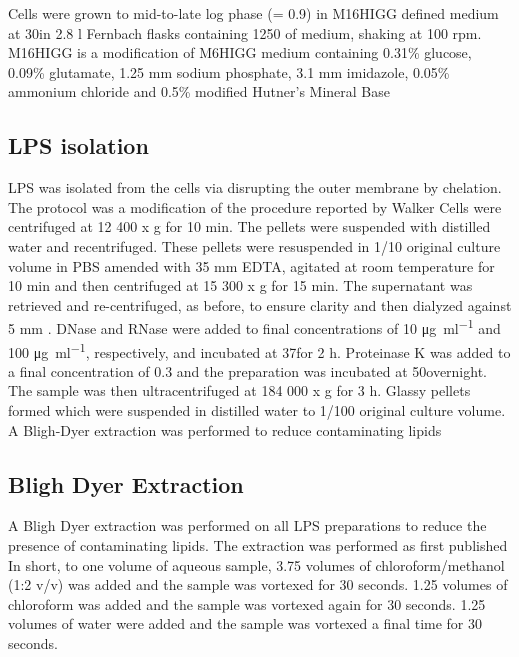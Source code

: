 		Cells were grown to mid-to-late log phase (\od = 0.9) in M16HIGG defined medium at 30\cel in 2.8 \si{\litre} Fernbach flasks containing 1250 \millilitre of medium, shaking at 100 rpm. M16HIGG is a modification of M6HIGG medium containing 0.31\% glucose, 0.09\% glutamate, 1.25 \si{\milli\meter} sodium phosphate, 3.1 \si{\milli\meter} imidazole, 0.05\% ammonium chloride and 0.5\% modified Hutner's Mineral Base 

	\subsection{\textsc{LPS} isolation} %
	\label{sub:LPS_isolation}

		\ac{LPS} was isolated from the cells via disrupting the outer membrane by chelation. The protocol was a modification of the procedure reported by Walker \etal{} Cells were centrifuged at 12 400 x g for 10 min. The pellets were suspended with distilled water and recentrifuged. These pellets were resuspended in 1/10 original culture volume in \ac{PBS} amended with 35 \si{\milli\meter} \ac{EDTA}, agitated at room temperature for 10 min and then centrifuged at 15 300 x g for 15 min. The supernatant was retrieved and re-centrifuged, as before, to ensure clarity and then dialyzed against 5 \si{\milli\meter} . DNase and RNase were added to final concentrations of 10 \si{\micro\gram\per\milli\litre} and 100 \si{\micro\gram\per\milli\litre}, respectively, and incubated at 37\cel for 2 h. Proteinase K was added to a final concentration of 0.3 \mgperml and the preparation was incubated at 50\cel overnight. The sample was then ultracentrifuged at 184 000 x g for 3 h. Glassy pellets formed which were suspended in distilled water to 1/100 original culture volume. A Bligh-Dyer extraction was performed to reduce contaminating lipids

	\subsection{Bligh Dyer Extraction} %
	\label{sub:bligh_dyer_extraction}
		A Bligh Dyer extraction was performed on all \ac{LPS} preparations to reduce the presence of contaminating lipids. The extraction was performed as first published In short,  to one volume of aqueous sample, 3.75 volumes of chloroform/methanol (1:2 v/v) was added and the sample was vortexed for 30 seconds. 1.25 volumes of chloroform was added and the sample was vortexed again for 30 seconds. 1.25 volumes of water were added and the sample was vortexed a final time for 30 seconds.

